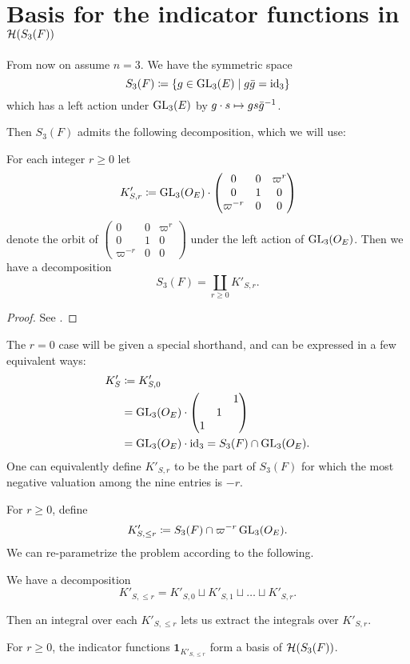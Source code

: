 \section{Basis for the indicator functions in $\mathcal H(S_3(F))$}
\label{ch:orbital0_hecke_basis}
From now on assume $n = 3$.
We have the symmetric space
\[ S_3(F) \coloneqq \left\{ g \in \operatorname{GL}_3(E) \mid g \bar{g} = \operatorname{id}_3 \right\} \]
which has a left action under $\operatorname{GL}_3(E)$ by $g \cdot s \mapsto gs\bar{g}^{-1}$.

Then $S_3(F)$ admits the following decomposition, which we will use:
\begin{lemma}
  For each integer $r \ge 0$ let
  \[ K'_{S,r} \coloneqq \operatorname{GL}_3(O_E) \cdot \begin{pmatrix} 0 & 0 & \varpi^r \\ 0 & 1 & 0 \\ \varpi^{-r} & 0 & 0 \end{pmatrix} \]
  denote the orbit of
  $\begin{pmatrix} 0 & 0 & \varpi^r \\ 0 & 1 & 0 \\ \varpi^{-r} & 0 & 0 \end{pmatrix}$
  under the left action of $\operatorname{GL}_3(O_E)$.
  Then we have a decomposition
  \[ S_3(F) = \coprod_{r \geq 0} K'_{S,r}. \]
\end{lemma}
\begin{proof}
  See \cite[\S3]{ref:pacific_offen_sphere}.
\end{proof}

The $r=0$ case will be given a special shorthand,
and can be expressed in a few equivalent ways:
\begin{align*}
  K'_S
  &\coloneqq K'_{S,0} \\
  &= \operatorname{GL}_3(O_E) \cdot \begin{pmatrix} & & 1 \\ & 1 \\ 1 \end{pmatrix} \\
  &= \operatorname{GL}_3(O_E) \cdot \operatorname{id}_3 = S_3(F) \cap \operatorname{GL}_3(O_E).
\end{align*}
One can equivalently define $K'_{S,r}$ to be the part of $S_3(F)$
for which the most negative valuation among the nine entries is $-r$.

For $r \geq 0$, define
\[ K'_{S, \le r} \coloneqq S_3(F) \cap \varpi^{-r} \operatorname{GL}_3(O_E). \]
We can re-parametrize the problem according to the following.
\begin{corollary}
  We have a decomposition
  \[ K'_{S, \le r} = K'_{S,0} \sqcup K'_{S,1} \sqcup \dots \sqcup K'_{S,r}. \]
\end{corollary}
Then an integral over each $K'_{S, \le r}$ lets us extract the integrals over $K'_{S,r}$.
\begin{corollary}
  For $r \ge 0$, the indicator functions $\mathbf{1}_{K'_{S, \le r}}$
  form a basis of $\mathcal H(S_3(F))$.
\end{corollary}

